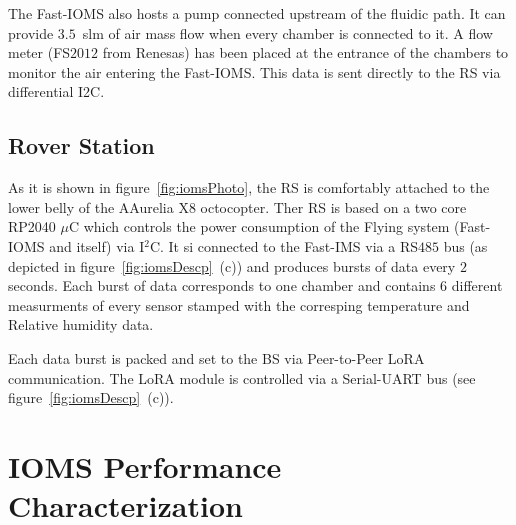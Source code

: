 \documentclass[lettersize,journal]{IEEEtran}
\begin{document}
 
The Fast-IOMS also hosts a pump connected upstream of the fluidic path. It can provide $3.5$~slm of air mass flow when every chamber is connected to it. A flow meter (FS$2012$ from Renesas) has been placed at the entrance of the chambers to monitor the air entering the Fast-IOMS. This data is sent directly to the RS via differential I2C.

\subsection{Rover Station}
\label{ssec:roverStation}

As it is shown in figure~\ref{fig:iomsPhoto}, the RS is comfortably attached to the lower belly of the AAurelia X8 octocopter. Ther RS is based on a two core RP2040 $\mu$C which controls the power consumption of the Flying system (Fast-IOMS and itself) via I$^{2}$C. It si connected to the Fast-IMS via a RS$485$ bus (as depicted in figure~\ref{fig:iomsDescp}~(c)) and produces bursts of data every $2$ seconds. Each burst of data corresponds to one chamber and contains $6$ different measurments of every sensor stamped with the corresping temperature and Relative humidity data.

Each data burst is packed and set to the BS via Peer-to-Peer LoRA communication. The LoRA module is controlled via a Serial-UART bus (see figure~\ref{fig:iomsDescp}~(c)). 

\section{IOMS Performance Characterization}
\label{sec:labChar}
\end{document}
